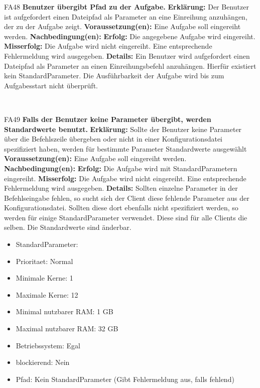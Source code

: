 \documentclass[a4paper,12pt]{article}
\begin{document}
\begin{itemize}[nosep]
	\begin{minipage}[t]{\linewidth}
		\item[FA48] \textbf{\gls{Benutzer} übergibt Pfad zu der \gls{Aufgabe}.}
		\subitem \textbf{Erklärung:} Der \gls{Benutzer} ist aufgefordert einen Dateipfad als \gls{Parameter} an eine Einreihung anzuhängen, der zu der \gls{Aufgabe} zeigt.
		\subitem \textbf{Voraussetzung(en):} Eine \gls{Aufgabe} soll eingereiht werden.
		\subitem \textbf{Nachbedingung(en):}
		\subsubitem \textbf{Erfolg:} Die angegebene \gls{Aufgabe} wird eingereiht.
		\subsubitem \textbf{Misserfolg:} Die \gls{Aufgabe} wird nicht eingereiht. Eine entsprechende Fehlermeldung wird ausgegeben.
		\subitem \textbf{Details:} Ein \gls{Benutzer} wird aufgefordert einen Dateipfad als \gls{Parameter} an einen Einreihungsbefehl anzuhängen. Hierfür existiert kein Standard\gls{Parameter}. Die Ausführbarkeit der \gls{Aufgabe} wird bis zum \glspl{Aufgabe}start nicht überprüft.
	\end{minipage}
	\newline
	\\
	
	\begin{minipage}[t]{\linewidth}
		\item[FA49] \textbf{Falls der \gls{Benutzer} keine \gls{Parameter} übergibt, werden Standardwerte benutzt.}
		\subitem \textbf{Erklärung:} Sollte der \gls{Benutzer} keine \gls{Parameter} über die \gls{Befehlszeile} übergeben oder nicht in einer \gls{Konfigurationsdatei} spezifiziert haben, werden für bestimmte \gls{Parameter} Standardwerte ausgewählt
		\subitem \textbf{Voraussetzung(en):} Eine \gls{Aufgabe} soll eingereiht werden.
		\subitem \textbf{Nachbedingung(en):}
		\subsubitem \textbf{Erfolg:} Die \gls{Aufgabe} wird mit Standard\gls{Parameter}n eingereiht.
		\subsubitem \textbf{Misserfolg:} Die \gls{Aufgabe} wird nicht eingereiht. Eine entsprechende Fehlermeldung wird ausgegeben.
		\subitem \textbf{Details:} Sollten einzelne \gls{Parameter} in der Befehlseingabe fehlen, so sucht sich der \gls{Client} diese fehlende \gls{Parameter} aus der \gls{Konfigurationsdatei}. Sollten diese dort ebenfalls nicht spezifiziert werden, so werden für einige Standard\gls{Parameter} verwendet.
		Diese sind für alle \glspl{Client} die selben. Die Standardwerte sind änderbar.
		\begin{itemize}[nosep,label={}]
			\item Standard\gls{Parameter}:
			\item \gls{Prioritaet}: Normal
			\item Minimale Kerne: 1
			\item Maximale Kerne: 12
			\item Minimal nutzbarer RAM: 1 GB
			\item Maximal nutzbarer RAM: 32 GB
			\item Betriebssystem: Egal
			\item blockierend: Nein
			\item Pfad: Kein Standard\gls{Parameter} (Gibt Fehlermeldung aus, falls fehlend)
	\end{itemize}
	\end{minipage}
	\newline
	\\
	

\end{itemize}
\end{document}
